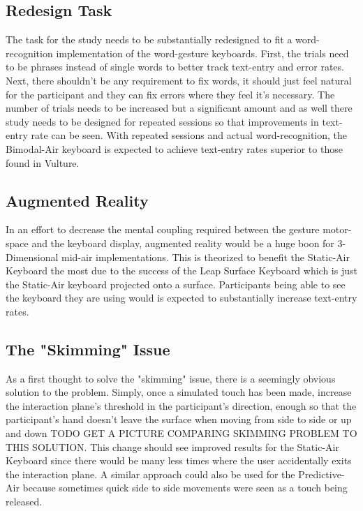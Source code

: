\subsection{Redesign Task}
The task for the study needs to be substantially redesigned to fit a word-recognition implementation of the word-gesture keyboards. First, the trials need to be phrases instead of single words to better track text-entry and error rates. Next, there shouldn't be any requirement to fix words, it should just feel natural for the participant and they can fix errors where they feel it's necessary. The number of trials needs to be increased but a significant amount and as well there study needs to be designed for repeated sessions so that improvements in text-entry rate can be seen. With repeated sessions and actual word-recognition, the Bimodal-Air keyboard is expected to achieve text-entry rates superior to those found in Vulture.

\subsection{Augmented Reality}
In an effort to decrease the mental coupling required between the gesture motor-space and the keyboard display, augmented reality would be a huge boon for 3-Dimensional mid-air implementations. This is theorized to benefit the Static-Air Keyboard the most due to the success of the Leap Surface Keyboard which is just the Static-Air keyboard projected onto a surface. Participants being able to see the keyboard they are using would is expected to substantially increase text-entry rates.

\subsection{The "Skimming" Issue}
As a first thought to solve the "skimming" issue, there is a seemingly obvious solution to the problem. Simply, once a simulated touch has been made, increase the interaction plane's threshold in the participant's direction, enough so that the participant's hand doesn't leave the surface when moving from side to side or up and down TODO GET A PICTURE COMPARING SKIMMING PROBLEM TO THIS SOLUTION. This change should see improved results for the Static-Air Keyboard since there would be many less times where the user accidentally exits the interaction plane. A similar approach could also be used for the Predictive-Air because sometimes quick side to side movements were seen as a touch being released.

